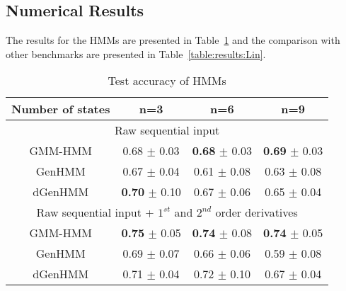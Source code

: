 \subsection{Numerical Results}
The results for the HMMs are presented in Table~\ref{table:results:HMM} and the comparison with other benchmarks are presented in Table~\ref{table:results:Lin}.

\begin{table}[!ht]
\center
\caption{Test accuracy of HMMs}
\setlength{\tabcolsep}{4pt}
\begin{tabular}{cccc}    
\toprule
Number of states 		&  n=3 			    				&  n=6									&  n=9 						\\  
\hline
                                        \multicolumn{4}{c}{Raw sequential input} 		\\
\hline
GMM-HMM				&   0.68 $\pm$ 0.03 		&    \textbf{0.68} $\pm$ 0.03 			&   	\textbf{0.69} $\pm$ 0.03  	\\
GenHMM  				&   0.67 $\pm$ 0.04     	&    0.61 $\pm$ 0.08   		    &   	0.63 $\pm$ 0.08   \\
dGenHMM 				&   \textbf{0.70} $\pm$ 0.10    	&	   0.67 $\pm$ 0.06      	    &  	    0.65 $\pm$ 0.04    \\
   \toprule
                                        \multicolumn{4}{c}{Raw sequential input + $1^{st}$ and $2^{nd}$ order derivatives}\\
\hline
GMM-HMM				&   \textbf{0.75} $\pm$ 0.05 		&    \textbf{0.74} $\pm$ 0.08			&   	\textbf{0.74} $\pm$ 0.05  	\\
GenHMM  				&   0.69 $\pm$ 0.07    	&    0.66 $\pm$ 0.06  		    &   	0.59 $\pm$ 0.08  \\
dGenHMM 				&  0.71 $\pm$ 0.04    		&	   0.72 $\pm$ 0.10     	    &  	   0.67 $\pm$ 0.04   \\
\bottomrule
\end{tabular}

\label{table:results:HMM}
\end{table}

